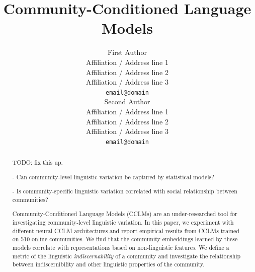 \documentclass[11pt]{article}
\title{Community-Conditioned Language Models}
\author{First Author \\
  Affiliation / Address line 1 \\
  Affiliation / Address line 2 \\
  Affiliation / Address line 3 \\
  \texttt{email@domain} \\\And
  Second Author \\
  Affiliation / Address line 1 \\
  Affiliation / Address line 2 \\
  Affiliation / Address line 3 \\
  \texttt{email@domain} \\}
\date{}
\begin{document}
\maketitle
\begin{abstract}

  TODO: fix this up.


  - Can community-level linguistic variation be captured by statistical models?
  
  - Is community-specific linguistic variation correlated with social
    relationship between communities?
  




    
  Community-Conditioned Language Models (CCLMs) are an under-researched tool for 
  investigating community-level linguistic variation.
  In this paper, we experiment with different neural CCLM architectures and
  report empirical results from CCLMs trained on 510 online communities.
  We find that the community embeddings learned by these models
  correlate with representations based on non-linguistic features.
  We define a metric of the linguistic \emph{indiscernability} of a community
  and investigate the relationship between indiscernibility and other
  linguistic properties of the community.
\end{abstract}





\end{document}
